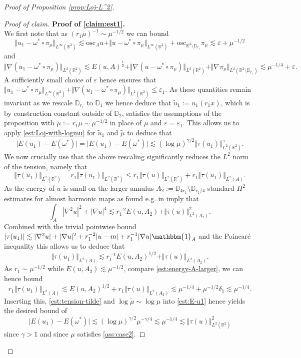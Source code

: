 \documentclass[10pt,reqno]{amsart}
\theoremstyle{plain}
\theoremstyle{definition}
\numberwithin{equation}{section}
\newcommand{\ga}{\gamma}
\newcommand{\de}{\delta}
\newcommand{\om}{\omega}
\newcommand{\D}{\mathbb{D}}
\newcommand{\R}{\ensuremath{{\mathbb R}}}
\newcommand{\osc}{\text{osc}}
\newcommand{\norm}[1]{\Vert#1\Vert}
\newcommand{\beq}{\begin{equation}}
\newcommand{\eeq}{\end{equation}}
\newcommand{\beqs}{\begin{equation*}}
\newcommand{\eeqs}{\end{equation*}}
\newcommand{\half}{\frac{1}{2}}
\newcommand{\leqs}{\lesssim}
\newcommand{\abs}[1]{\vert#1\vert}
\newcommand{\eps}{\varepsilon}
\newcommand{\na}{\nabla}
\begin{document}
\begin{proof}[Proof of Proposition \ref{prop:Loj-L^2}]
\begin{proof}[Proof of claim]
\textbf{Proof of \eqref{claim:est1}.}\\
We first note that as $(r_1 \mu)^{-1}\sim \mu^{-1/2}$ we can bound
$$ 
\norm{u_1-\om^*\circ\pi_{\mu}}_{L^\infty(\R^2)} \leqs \osc_A u + \norm{u-\om^*\circ\pi_{\mu}}_{L^\infty(\R^2)}+\osc_{\R^2\setminus \D_{r_1}}\pi_\mu\leqs  \eps+\mu^{-1/2} 
$$ and 
$$\norm{\na (u_1-\om^*\circ\pi_{\mu})}_{L^2(\R^2)}
\leqs E(u,A)^\half+\norm{\na (u-\om^*\circ\pi_{\mu})}_{L^2(\R^2)} +\norm{\na \pi_\mu}_{L^2(\R^2\setminus \D_{r_1})}\leqs \mu^{-1/4}+\eps.
$$
A sufficiently small choice of $\eps$ hence ensures that $\norm{u_1-\om^*\circ\pi_{\mu}}_{L^\infty(\R^2)}+\norm{\na (u_1-\om^*\circ\pi_{\mu})}_{L^2(\R^2)}\leq \eps_1$.
As these quantities remain invariant as we rescale $\D_{r_1}$ to $\D_1$ we hence deduce that $\tilde u_1:=u_1(r_1 x)$, which is by construction constant outside of $\D_2$, satisfies the assumptions of the proposition with $\tilde \mu:= r_1 \mu\sim \mu^{-1/2}$ in place of $\mu$ and $\eps=\eps_1$. This allows us to apply \eqref{est:Loj-with-logmu} for $\tilde u_1$ and $\tilde \mu$ to deduce that  
\beq \label{est:E-u1}
\abs{E(u_1)-E(\om^*)}=\abs{E(u_1)-E(\om^*)}
\leqs
(\log\tilde \mu)^{\ga/2}
\norm{\tau(\tilde u_1)}_{L^2(\R^2)}^\ga.
\eeq
We now crucially use that the above rescaling significantly reduces the $L^2$ norm of the tension, namely that 
\beq 
\label{est:tension-tilde}
\norm{\tau(\tilde u_1)}_{L^2(\R^2)}=r_1\norm{\tau(u_1)}_{L^2(\R^2)}\leq r_1\norm{\tau(u)}_{L^2(\R^2)}+r_1 \norm{\tau(u_1)}_{L^2(A)}.\eeq 
As the energy of $u$ is small on the larger annulus $A_2:=\D_{4r_1}\setminus\D_{r_1/4}$ standard $H^2$ estimates for almost harmonic maps as found e.g. in \cite[Lemma $2.1$]{dingtian} imply that 
\beqs
\int_{A} |\na^2u|^2+|\na u|^4
\leqs
r_1^{-2}E(u,A_2)
+
\norm{\tau(u)}_{L^2(A_2)}^2.
\eeqs
Combined with the trivial pointwise bound $\abs{\tau(u_1)}\leqs \abs{\na^2 u}+\abs{\na u}^2+r_1^{-2} \abs{u-m}+r_1^{-1}\abs{\na u} \mathbbm{1}_A$ and the Poincar\'e inequality this allows us to deduce that 
$$\norm{\tau(u_1)}_{L^2(A)}\leqs r_1^{-1} E(u,A_2)^{1/2}+\norm{\tau(u)}_{L^2(A_2)}.$$
As $r_1\sim \mu^{-1/2}$ while $E(u,A_2)\leqs \mu^{-1/2}$, compare \eqref{est:energy-A-larger}, we can hence bound  
$$r_1\norm{\tau(u_1)}_{L^2(A)}\leqs  E(u,A_2)^{1/2}+r_1\norm{\tau(u)}_{L^2(A_2)}\leqs \mu^{-1/4}+\mu^{-1/2} \de_1\leqs \mu^{-1/4}.$$
Inserting this, \eqref{est:tension-tilde} and  $\log\tilde\mu\sim \log \mu$ into \eqref{est:E-u1} hence yields the desired bound of   
$$\abs{E(u_1)-E(\om^*)}
\leqs
(\log \mu)^{\ga/2} \mu^{-\gamma/4}\leqs \mu^{-1/4}\leqs \norm{\tau(u)}_{L^2(\R^2)}^2$$
since $\gamma>1$ and since $\mu$ satisfies \eqref{ass:case2}. 
\end{proof}


\end{proof}
\end{document}
